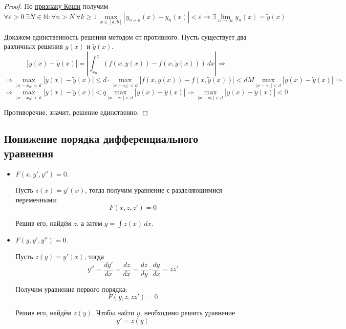 \begin{proof}
По \hyperref[th:Cauchy_criterion]{признаку Коши} получим
\begin{equation*}
\forall \varepsilon > 0 \ \exists N \in \mathbb N \colon \forall n > N \ \forall k \geqslant 1 \
\max_{x \in [a; b]} |y_{n+k}(x) - y_n(x)| < \varepsilon \Rightarrow
\exists \lim_{n \to \infty} y_n(x) = \tilde y(x)
\end{equation*}

Докажем единственность решения методом от противного.
Пусть существует два различных решения $y(x)$ и $\tilde y(x)$.
\begin{equation*}
|y(x) - \tilde y(x)| =
\left| \int_{x_0}^x (f(x, y(x)) - f(x, \tilde y(x)))\,dx \right| \Rightarrow
\end{equation*}
\begin{equation*}
\Rightarrow \max_{|x - x_0| < d} |y(x) - \tilde y(x)| \leqslant
d \cdot \max_{|x - x_0| < d} |f(x, y(x)) - f(x, \tilde y(x))| <
d M \max_{|x - x_0| < d} |y(x) - \tilde y(x)| \Rightarrow
\end{equation*}
\begin{equation*}
\Rightarrow \max_{|x - x_0| < d} |y(x) - \tilde y(x)| < q \max_{|x - x_0| < d} |y(x) - \tilde y(x)| \Rightarrow
\max_{|x - x_0| < d} |y(x) - \tilde y(x)| < 0
\end{equation*}

Противоречие, значит, решение единственно.
\end{proof}

\subsection{Понижение порядка дифференциального уравнения}
\begin{itemize}
	\item $F(x, y', y'') = 0$.
	
	Пусть $z(x) = y'(x)$, тогда получим уравнение с разделяющимися переменными:
	\begin{equation*}
	F(x, z, z') = 0
	\end{equation*}
	
	Решив его, найдём $z$, а затем $y = \int z(x)\,dx$.
	
	\item $F(y, y', y'') = 0$.
	
	Пусть $z(y) = y'(x)$, тогда
	\begin{equation*}
	y'' = \frac{dy'}{dx} =
	\frac{dz}{dx} =
	\frac{dz}{dy} \cdot \frac{dy}{dx} =
	z z'
	\end{equation*}
	
	Получим уравнение первого порядка:
	\begin{equation*}
	F(y, z, z z') = 0
	\end{equation*}
	
	Решив его, найдём $z(y)$.
	Чтобы найти $y$, необходимо решить уравнение
	\begin{equation*}
	y' = z(y)
	\end{equation*}
\end{itemize}